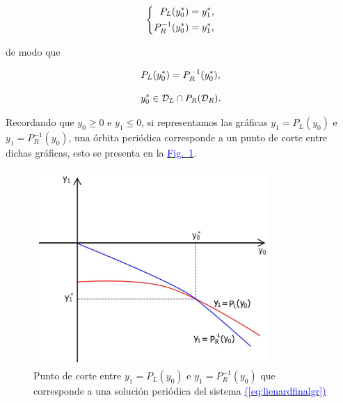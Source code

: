 \documentclass[12pt,a4paper]{report} %
\newcommand{\fref}[1]{\hyperref[#1]{\textcolor{blue}{Fig.~\ref*{#1}}}}
\newcommand{\eref}[1]{\hyperref[#1]{\textcolor{blue}{(\ref*{#1})}}}
\newcommand{\fref}[1]{\hyperref[#1]{\textcolor{blue}{\textit{Fig.~\ref*{#1}}}}}
\newcommand{\eref}[1]{\hyperref[#1]{\textcolor{blue}{\textit{(\ref*{#1})}}}}
\begin{document}
	\begin{equation*}
		\label{eq:ej2}
		\scalebox{1}{$\displaystyle
			\left\{
			\begin{aligned}
				P_L(y_0^*)=y_1^*, \\
				P_R^{-1}(y_0^*)=y_1^*,
			\end{aligned}
			\right. 
			$}
	\end{equation*}\smallskip
	
	\noindent de modo que
	
	\begin{equation*}
		\scalebox{1}{$\displaystyle
		P_L(y_0^*)=P_R^{-1}(y_0^*),
		$}
	\end{equation*}
	
	\begin{equation*}
		\scalebox{1}{$\displaystyle
		y_0^* \in \mathcal{D}_L \cap P_R(\mathcal{D}_R).
		$}
	\end{equation*}
	
	\vspace{0.5cm}\noindent Recordando que $y_0\geq0$ e $y_1\leq0$, si representamos las gráficas $y_1=P_L(y_0)$ e $y_1=P_R^{-1}(y_0)$, una órbita periódica corresponde a un punto de corte entre dichas gráficas, esto se presenta en la \fref{fig:graficaejemplo}.
	
	\begin{figure}[h]
		\centering
		\includegraphics[width=0.8\textwidth]{graficaejemplo.jpg}
		\caption{Punto de corte entre $y_1=P_L(y_0)$ e $y_1=P_R^{-1}(y_0)$ que corresponde a una solución periódica del sistema \eref{eq:lienardfinalgr}}
		\label{fig:graficaejemplo}
	\end{figure}\smallskip
	
	\newpage
	
\end{document}

